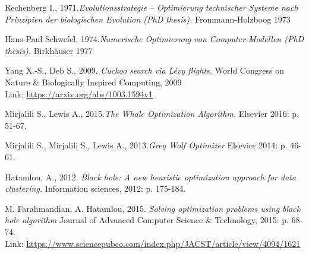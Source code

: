 \documentclass[border=0.2cm]{report}
\begin{document}
\begin{thebibliography}{9}

Rechenberg I., 1971.\textit{Evolutionsstrategie – Optimierung technischer Systeme nach Prinzipien der biologischen Evolution (PhD thesis).} Frommann-Holzboog 1973

Hans-Paul Schwefel, 1974.\textit{Numerische Optimierung von Computer-Modellen (PhD thesis).} Birkhäuser 1977

Yang X.-S., Deb S., 2009. \textit{Cuckoo search via Lévy flights.} World Congress on Nature \& Biologically Inspired Computing, 2009 \\
Link: \url{https://arxiv.org/abs/1003.1594v1}

Mirjalili S., Lewis A., 2015.\textit{The Whale Optimization Algorithm.} Elsevier 2016: p. 51-67.

Mirjalili S., Mirjalili S., Lewis A., 2013.\textit{Grey Wolf Optimizer} Elsevier 2014: p. 46-61.

Hatamlou, A., 2012. \textit{Black hole: A new heuristic optimization approach for data clustering.} Information sciences, 2012: p. 175-184. 

M. Farahmandian, A. Hatamlou, 2015. \textit{Solving optimization problems using black hole algorithm} Journal of Advanced Computer Science \& Technology, 2015: p. 68-74. \\
Link: \url{https://www.sciencepubco.com/index.php/JACST/article/view/4094/1621}

\end{thebibliography}
\end{document}

